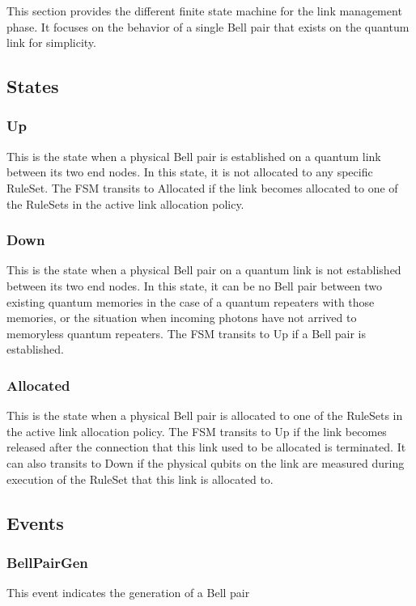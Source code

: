 This section provides the different finite state machine for the link management phase. It focuses on the behavior of a single Bell pair that exists on the quantum link for simplicity.

\subsection{States}

\subsubsection{Up}
This is the state when a physical Bell pair is established on a quantum link between its two end nodes. In this state, it is not allocated to any specific RuleSet.
The FSM transits to Allocated if the link becomes allocated to one of the RuleSets in the active link allocation policy.

\subsubsection{Down}
This is the state when a physical Bell pair on a quantum link is not established between its two end nodes. In this state, it can be no Bell pair between two existing quantum memories in the case of a quantum repeaters with those memories, or the situation when incoming photons have not arrived to memoryless quantum repeaters.
The FSM transits to Up if a Bell pair is established.

\subsubsection{Allocated}
This is the state when a physical Bell pair is allocated to one of the RuleSets in the active link allocation policy.
The FSM transits to Up if the link becomes released after the connection that this link used to be allocated is terminated.
It can also transits to Down if the physical qubits on the link are measured during execution of the RuleSet that this link is allocated to.

\subsection{Events}

\subsubsection{BellPairGen}
This event indicates the generation of a Bell pair

